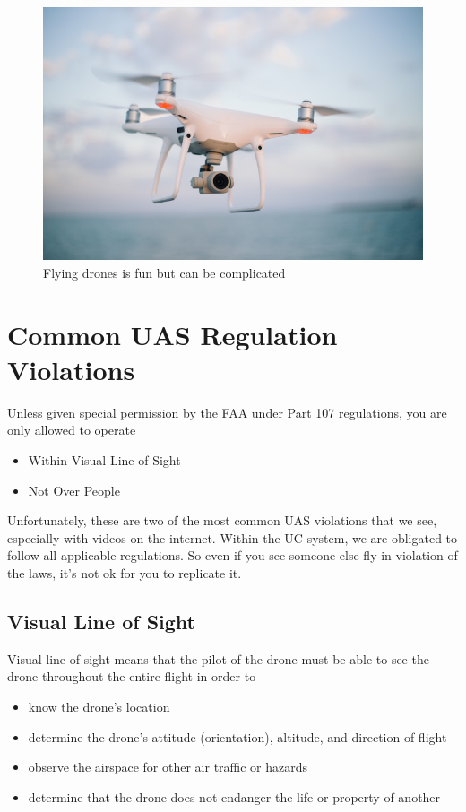 \documentclass[
  12pt,
]{book}
\providecommand{\tightlist}{%
  \setlength{\itemsep}{0pt}\setlength{\parskip}{0pt}}
\begin{document}
\begin{figure}

{\centering \includegraphics[width=0.75\linewidth]{images/phantom_1} 

}

\caption{Flying drones is fun but can be complicated}\label{fig:drone2}
\end{figure}

\section{Common UAS Regulation Violations}\label{common-UAS-violations}

Unless given special permission by the FAA under Part 107 regulations, you are only allowed to operate

\begin{itemize}
\tightlist
\item
  Within Visual Line of Sight
\item
  Not Over People
\end{itemize}

Unfortunately, these are two of the most common UAS violations that we see, especially with videos on the internet. Within the UC system, we are obligated to follow all applicable regulations. So even if you see someone else fly in violation of the laws, it's not ok for you to replicate it.

\subsection{Visual Line of Sight}\label{visual-line-of-sight}

Visual line of sight means that the pilot of the drone must be able to see the drone throughout the entire flight in order to

\begin{itemize}
\tightlist
\item
  know the drone's location
\item
  determine the drone's attitude (orientation), altitude, and direction of flight
\item
  observe the airspace for other air traffic or hazards
\item
  determine that the drone does not endanger the life or property of another
\end{itemize}
\end{document}
